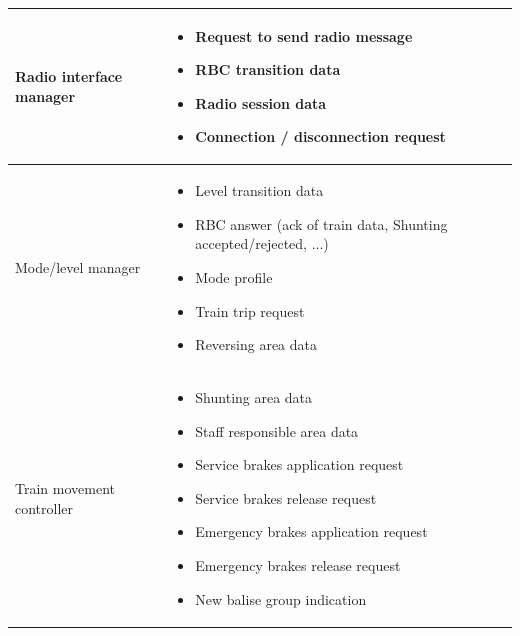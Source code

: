 \documentclass[nocc]{template/openetcs_report}
\begin{document}
\begin{longtable}{|l|l|}
				\hline
					
					\begin{minipage}[t]{0.35\linewidth} Radio interface manager	\end{minipage} 
				&	\begin{minipage}[t]{0.65\linewidth}
						\begin{itemize}
							\item Request to send radio message
							\item RBC transition data
							\item Radio session data
							\item Connection / disconnection request
						\end{itemize}			
					\end{minipage} \\
				
				\hline
									
					\begin{minipage}[t]{0.35\linewidth} Mode/level manager	\end{minipage} 
				&	\begin{minipage}[t]{0.65\linewidth}
						\begin{itemize}
							\item Level transition data
							\item RBC answer (ack of train data, Shunting accepted/rejected, ...)
							\item Mode profile
							\item Train trip request
							\item Reversing area data
						\end{itemize}			
					\end{minipage} \\
				
				\hline
													
					\begin{minipage}[t]{0.35\linewidth} Train movement controller	\end{minipage} 
				&	\begin{minipage}[t]{0.65\linewidth}
						\begin{itemize}
							\item Shunting area data
							\item Staff responsible area data
							\item Service brakes application request
							\item Service brakes release request
							\item Emergency brakes application request
							\item Emergency brakes release request
							\item New balise group indication
						\end{itemize}			
					\end{minipage} \\
				

\end{longtable}
\end{document}
